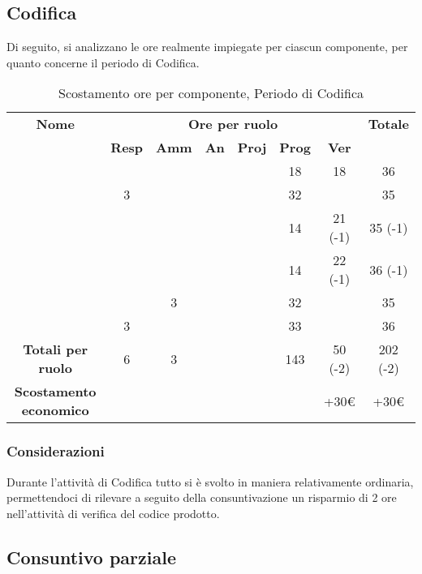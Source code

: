 \newpage
\subsection{Codifica}

Di seguito, si analizzano le ore realmente impiegate per ciascun componente, per quanto concerne il periodo di Codifica.

\begin{table}[H]
	\begin{center}
		\begin{tabular}{|c|c|c|c|c|c|c|c|}
			\hline
			\textbf{Nome} & \multicolumn{6}{c|}{\textbf{Ore per ruolo}} & \textbf{Totale} \\\cline{2-7}
			& \textbf{Resp} & \textbf{Amm} & \textbf{An} & \textbf{Proj} & \textbf{Prog} & \textbf{Ver} & \\
			\hline
			\MC			&		&		&		&		&	18	&	18	&	36	\\
			\hline
			\AN			&	3	&		&		&	 	&	32	&		& 	35	\\
			\hline
			\DAN		&		&		&		&		&	14	&	21 (-1)	&	35 (-1)	\\
			\hline
			\AS			&		&	 	&	 	&		&	14 	& 	22 (-1)	&	36	(-1)\\
			\hline
			\NS 		&		&	3	&		&		&	32	& 		&	35	\\
			\hline
			\DS			& 	3	&		&		&		&	33	&		&	36	\\
			\hline
			\textbf{Totali per ruolo}	& 	6 	&	3 	&		&		&	143	&	50 (-2) 	&	202 (-2)	\\
			\hline
			\textbf{Scostamento economico}	& 		&		&		&		&		&	+30€	&	+30€	\\
			\hline
		\end{tabular}
	\end{center}
	\caption{Scostamento ore per componente, Periodo di Codifica}
\end{table}

\subsubsection{Considerazioni}
Durante l'attività di Codifica tutto si è svolto in maniera relativamente ordinaria, permettendoci di rilevare a seguito della consuntivazione un risparmio di 2 ore nell'attività di verifica del codice prodotto. 

\newpage
\subsection{Consuntivo parziale}

